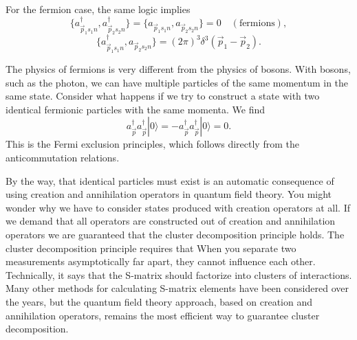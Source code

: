 \documentclass[11pt]{article}
\theoremstyle{definition}
\begin{document}
For the fermion case, the same logic implies
\begin{equation}
\{a_{\vec{p}_{1}s_{1}n}^{\dagger}, a_{\vec{p}_{2}s_{2}n}^{\dagger}\} = \{a_{\vec{p}_{1}s_{1}n}, a_{\vec{p}_{2}s_{2}n}\} = 0 \quad (\text{fermions}),
\end{equation}
\begin{equation}
\{a_{\vec{p}_{1}s_{1}n}^{\dagger}, a_{\vec{p}_{2}s_{2}n}\} = (2\pi)^{3}\delta^{3}(\vec{p}_{1} - \vec{p}_{2}).
\end{equation}

The physics of fermions is very different from the physics of bosons. With bosons, such as the photon, we can have multiple particles of the same momentum in the same state. Consider what happens if we try to construct a state with two identical fermionic particles with the same momenta. We find
\begin{equation}
a_{\vec{p}}^{\dagger}a_{\vec{p}}^{\dagger}|0\rangle = -a_{\vec{p}}^{\dagger}a_{\vec{p}}^{\dagger}|0\rangle = 0.
\end{equation}
This is the Fermi exclusion principles, which follows directly from the anticommutation relations. 

By the way, that identical particles must exist is an automatic consequence of using creation and annihilation operators in quantum field theory. You might wonder why we have to consider states produced with creation operators at all. If we demand that all operators are constructed out of creation and annihilation operators we are guaranteed that the cluster decomposition principle holds.  The cluster decomposition principle requires that When you separate two measurements asymptotically far apart,  they cannot influence each other. Technically, it says that the S-matrix should factorize into clusters of interactions. Many other methods for calculating S-matrix elements have been considered over the years, but the quantum field theory approach, based on creation and annihilation operators,  remains the most efficient way to guarantee cluster decomposition.
\end{document}
